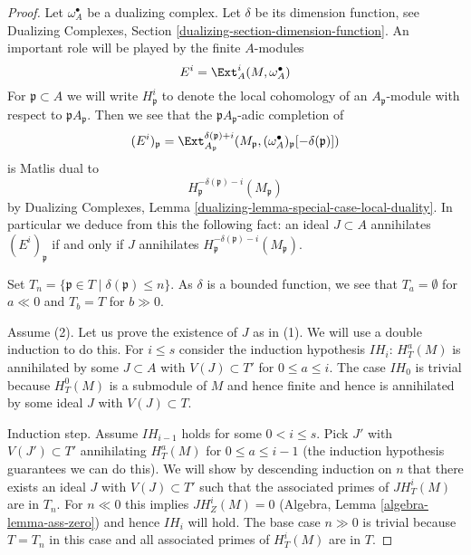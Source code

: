 \begin{proof}
Let $\omega_A^\bullet$ be a dualizing complex. Let $\delta$ be its
dimension function, see Dualizing Complexes, Section
\ref{dualizing-section-dimension-function}.
An important role will be played by the finite $A$-modules
$$
E^i = \Ext_A^i(M, \omega_A^\bullet)
$$
For $\mathfrak p \subset A$ we will write $H^i_\mathfrak p$ to denote the
local cohomology of an $A_\mathfrak p$-module with respect to
$\mathfrak pA_\mathfrak p$. Then we see that
the $\mathfrak pA_\mathfrak p$-adic completion of
$$
(E^i)_\mathfrak p =
\Ext^{\delta(\mathfrak p) + i}_{A_\mathfrak p}(M_\mathfrak p,
(\omega_A^\bullet)_\mathfrak p[-\delta(\mathfrak p)])
$$
is Matlis dual to
$$
H^{-\delta(\mathfrak p) - i}_{\mathfrak p}(M_\mathfrak p)
$$
by
Dualizing Complexes, Lemma \ref{dualizing-lemma-special-case-local-duality}.
In particular we deduce from this the
following fact: an ideal $J \subset A$ annihilates
$(E^i)_\mathfrak p$ if and only if $J$ annihilates
$H^{-\delta(\mathfrak p) - i}_{\mathfrak p}(M_\mathfrak p)$.

\medskip\noindent
Set $T_n = \{\mathfrak p \in T \mid \delta(\mathfrak p) \leq n\}$.
As $\delta$ is a bounded function, we see that
$T_a = \emptyset$ for $a \ll 0$ and $T_b = T$ for $b \gg 0$.

\medskip\noindent
Assume (2). Let us prove the existence of $J$ as in (1).
We will use a double induction to do this. For $i \leq s$
consider the induction hypothesis $IH_i$:
$H^a_T(M)$ is annihilated by some $J \subset A$ with $V(J) \subset T'$
for $0 \leq a \leq i$. The case $IH_0$ is trivial
because $H^0_T(M)$ is a submodule of $M$ and hence finite
and hence is annihilated by some ideal $J$ with $V(J) \subset T$.

\medskip\noindent
Induction step. Assume $IH_{i - 1}$ holds for some $0 < i \leq s$.
Pick $J'$ with $V(J') \subset T'$ annihilating $H^a_T(M)$ for
$0 \leq a \leq i - 1$ (the induction hypothesis guarantees we can
do this). We will show by descending induction on $n$
that there exists an ideal $J$ with $V(J) \subset T'$ such that the
associated primes of $J H^i_T(M)$ are in $T_n$.
For $n \ll 0$ this implies $JH^i_Z(M) = 0$ 
(Algebra, Lemma \ref{algebra-lemma-ass-zero})
and hence $IH_i$ will hold.
The base case $n \gg 0$ is trivial because $T = T_n$ in this case
and all associated primes of $H^i_T(M)$ are in $T$.


\end{proof}
